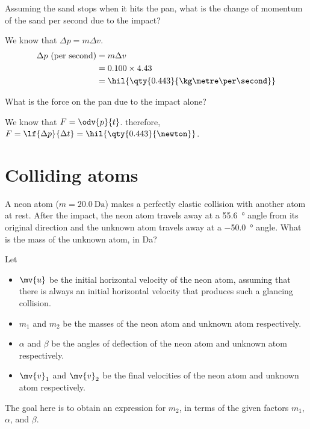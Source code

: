 \begin{problem}
Assuming the sand stops when it hits the pan, what is the change
of momentum of the sand per second due to the impact?
\end{problem}
We know that \(\Delta{p} = m\Delta{v}\).
\begin{align*}
	\Delta{p} \text{ (per second)} & = m\Delta{v}                              \\
	                               & = 0.100 \times 4.43                       \\
	                               & = \hil{\qty{0.443}{\kg\metre\per\second}}
\end{align*}

\begin{problem}
What is the force on the pan due to the impact alone?
\end{problem}
We know that \({F} = \odv{{p}}{t}\). therefore, \({F} =
\lf{\Delta{p}}{\Delta t} = \hil{\qty{0.443}{\newton}}\).


\section{Colliding atoms}
\begin{problem}
A neon atom (\(m = \qty{20.0}{\dalton}\)) makes a perfectly elastic
collision with another atom at rest.
After the impact, the neon atom travels away at a \qty{55.6}{\degree}
angle from its original direction
and the unknown atom travels away at a \qty{-50.0}{\degree} angle.
What is the mass of the unknown atom, in \unit{\dalton}?
\end{problem}

Let
\begin{itemize}
	\item \(\mv{u}\) be the initial horizontal velocity of the neon
	      atom, assuming that there is always an initial horizontal
	      velocity that produces such a glancing collision.
	\item \(m_1\) and \(m_2\) be the masses of the neon atom and
	      unknown atom respectively.
	\item \(\alpha\) and \(\beta\) be the angles of deflection of the
	      neon atom and unknown atom respectively.
	\item \(\mv{v}_1\) and \(\mv{v}_2\) be the final velocities of the
	      neon atom and unknown atom respectively.
\end{itemize}
The goal here is to obtain an expression for \(m_2\), in terms of the
given factors
\(m_1\), \(\alpha\), and \(\beta\).

